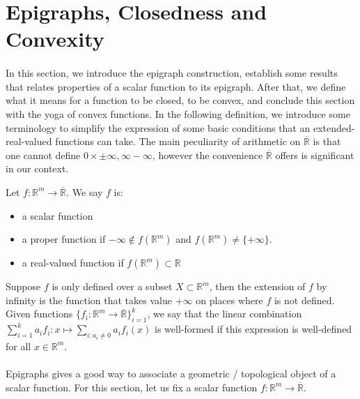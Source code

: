 \section{Epigraphs, Closedness and Convexity}
\label{sect:021}

\paragraph{}In this section, we introduce the epigraph construction, establish some results that relates properties of a scalar function to its epigraph. After that, we define what it means for a function to be closed, to be convex, and conclude this section with the yoga of convex functions. In the following definition, we introduce some terminology to simplify the expression of some basic conditions that an extended-real-valued functions can take. The main peculiarity of arithmetic on $\overline{\mathbb{R}}$ is that one cannot define $0\times\pm\infty,\infty-\infty$, however the convenience $\overline{\mathbb{R}}$ offers is significant in our context.

\begin{defn}
	\label{defn:021-functions-def}
	Let $f:\mathbb{R}^m\to \overline{\mathbb{R}}$. We say $f$ is:
	\begin{itemize}
		\item a scalar function
		\item a proper function if $-\infty\notin f(\mathbb{R}^m)$ and $f(\mathbb{R}^m)\neq \{+\infty\}$.
		\item a real-valued function if $f(\mathbb{R}^m)\subset \mathbb{R}$
	\end{itemize}
	Suppose $f$ is only defined over a subset $X\subset \mathbb{R}^m$, then the extension of $f$ by infinity is the function that takes value $+\infty$ on places where $f$ is not defined. Given functions $\{f_i:\mathbb{R}^m\to \overline{\mathbb{R}}\}_{i=1}^k$, we say that the linear combination $\sum_{i=1}^ka_if_i:x\mapsto\sum_{i:a_i\neq 0}a_if_i(x)$ is well-formed if this expression is well-defined for all $x\in \mathbb{R}^m$.
\end{defn}

\paragraph{}Epigraphs gives a good way to associate a geometric / topological object of a scalar function. For this section, let us fix a scalar function $f:\mathbb{R}^m\to \overline{\mathbb{R}}$.

